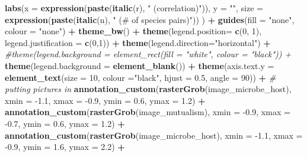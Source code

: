 \documentclass[
]{article}
\newenvironment{Shaded}{\begin{snugshade}}{\end{snugshade}}
\newcommand{\CommentTok}[1]{\textcolor[rgb]{0.56,0.35,0.01}{\textit{#1}}}
\newcommand{\DataTypeTok}[1]{\textcolor[rgb]{0.13,0.29,0.53}{#1}}
\newcommand{\DecValTok}[1]{\textcolor[rgb]{0.00,0.00,0.81}{#1}}
\newcommand{\FloatTok}[1]{\textcolor[rgb]{0.00,0.00,0.81}{#1}}
\newcommand{\KeywordTok}[1]{\textcolor[rgb]{0.13,0.29,0.53}{\textbf{#1}}}
\newcommand{\NormalTok}[1]{#1}
\newcommand{\OperatorTok}[1]{\textcolor[rgb]{0.81,0.36,0.00}{\textbf{#1}}}
\newcommand{\StringTok}[1]{\textcolor[rgb]{0.31,0.60,0.02}{#1}}
\begin{document}
\begin{Shaded}
\begin{Highlighting}[]
{{{{{\StringTok{  }\KeywordTok{labs}\NormalTok{(}\DataTypeTok{x =} \KeywordTok{expression}\NormalTok{(}\KeywordTok{paste}\NormalTok{(}\KeywordTok{italic}\NormalTok{(r), }\StringTok{" (correlation)"}\NormalTok{)), }\DataTypeTok{y =} \StringTok{""}\NormalTok{, }\DataTypeTok{size =} \KeywordTok{expression}\NormalTok{(}\KeywordTok{paste}\NormalTok{(}\KeywordTok{italic}\NormalTok{(n), }\StringTok{" (# of species pairs)"}\NormalTok{)) ) }\OperatorTok{+}
\StringTok{  }\KeywordTok{guides}\NormalTok{(}\DataTypeTok{fill =} \StringTok{"none"}\NormalTok{, }\DataTypeTok{colour =} \StringTok{"none"}\NormalTok{) }\OperatorTok{+}
\StringTok{  }\KeywordTok{theme_bw}\NormalTok{() }\OperatorTok{+}
\StringTok{  }\KeywordTok{theme}\NormalTok{(}\DataTypeTok{legend.position=} \KeywordTok{c}\NormalTok{(}\DecValTok{0}\NormalTok{, }\DecValTok{1}\NormalTok{), }\DataTypeTok{legend.justification =} \KeywordTok{c}\NormalTok{(}\DecValTok{0}\NormalTok{,}\DecValTok{1}\NormalTok{)) }\OperatorTok{+}
\StringTok{  }\KeywordTok{theme}\NormalTok{(}\DataTypeTok{legend.direction=}\StringTok{"horizontal"}\NormalTok{) }\OperatorTok{+}
\StringTok{  }\CommentTok{#theme(legend.background = element_rect(fill = "white", colour = "black")) +}
\StringTok{  }\KeywordTok{theme}\NormalTok{(}\DataTypeTok{legend.background =} \KeywordTok{element_blank}\NormalTok{()) }\OperatorTok{+}
\StringTok{  }\KeywordTok{theme}\NormalTok{(}\DataTypeTok{axis.text.y =} \KeywordTok{element_text}\NormalTok{(}\DataTypeTok{size =} \DecValTok{10}\NormalTok{, }\DataTypeTok{colour =}\StringTok{"black"}\NormalTok{, }\DataTypeTok{hjust =} \FloatTok{0.5}\NormalTok{, }\DataTypeTok{angle =} \DecValTok{90}\NormalTok{)) }\OperatorTok{+}
\StringTok{  }\CommentTok{# putting pictures in}
\StringTok{  }\KeywordTok{annotation_custom}\NormalTok{(}\KeywordTok{rasterGrob}\NormalTok{(image_microbe_host), }\DataTypeTok{xmin =} \FloatTok{-1.1}\NormalTok{, }\DataTypeTok{xmax =} \FloatTok{-0.9}\NormalTok{, }\DataTypeTok{ymin =} \FloatTok{0.6}\NormalTok{, }\DataTypeTok{ymax =} \FloatTok{1.2}\NormalTok{) }\OperatorTok{+}\StringTok{ }
\StringTok{  }\KeywordTok{annotation_custom}\NormalTok{(}\KeywordTok{rasterGrob}\NormalTok{(image_mutualism), }\DataTypeTok{xmin =} \FloatTok{-0.9}\NormalTok{, }\DataTypeTok{xmax =} \FloatTok{-0.7}\NormalTok{, }\DataTypeTok{ymin =} \FloatTok{0.6}\NormalTok{, }\DataTypeTok{ymax =} \FloatTok{1.2}\NormalTok{) }\OperatorTok{+}\StringTok{ }
\StringTok{  }\KeywordTok{annotation_custom}\NormalTok{(}\KeywordTok{rasterGrob}\NormalTok{(image_microbe_host), }\DataTypeTok{xmin =} \FloatTok{-1.1}\NormalTok{, }\DataTypeTok{xmax =} \FloatTok{-0.9}\NormalTok{, }\DataTypeTok{ymin =} \FloatTok{1.6}\NormalTok{, }\DataTypeTok{ymax =} \FloatTok{2.2}\NormalTok{) }\OperatorTok{+}
}}}}}
\end{Highlighting}
\end{Shaded}
\end{document}
